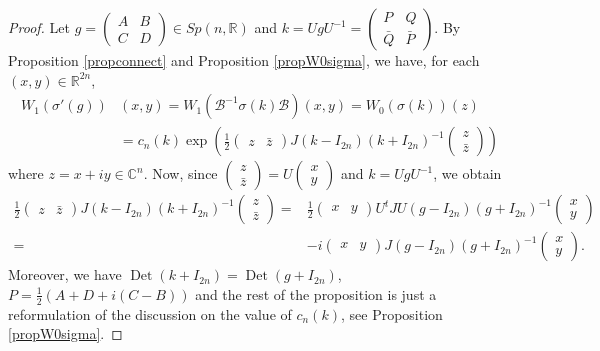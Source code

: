 \documentclass[12pt]{amsart}
\numberwithin{equation}{section}
\DeclareMathOperator{\Det}{Det} \DeclareMathOperator{\Tr}{Tr}
\begin{document}
\begin{proof} Let $g=\left(\begin{smallmatrix} A&B\\
C&D\end{smallmatrix}\right)\in Sp(n,{\mathbb R})$ and $k=UgU^{-1}=
\left(\begin{smallmatrix} P&Q\\
{\bar Q}&{\bar P}\end{smallmatrix}\right)$. By Proposition \ref{propconnect} and Proposition \ref{propW0sigma}, we have, for each $(x,y)\in {\mathbb R}^{2n}$, 
\begin{align*}W_1(\sigma'(g))&(x,y)=W_1({\mathcal B}^{-1}\sigma(k){\mathcal B})(x,y)=
W_0(\sigma(k))(z)\\
&=
c_n(k) \exp \left( \tfrac{1}{2}\begin{pmatrix}z&
{\bar z}\end{pmatrix}J(k-I_{2n})
(k+I_{2n})^{-1}\begin{pmatrix}z\\{\bar z}\end{pmatrix}\right)
\end{align*} where $z=x+iy\in {\mathbb C}^{n}$.
Now, since $\left(\begin{smallmatrix}z\\{\bar z}\end{smallmatrix}\right)=U
\left(\begin{smallmatrix}x\\y\end{smallmatrix}\right)$ and $k=UgU^{-1}$, we obtain
\begin{align*}
 \tfrac{1}{2}\begin{pmatrix}z&
{\bar z}\end{pmatrix}J(k-I_{2n})
(k+I_{2n})^{-1}\begin{pmatrix}z\\{\bar z}\end{pmatrix}=& \tfrac{1}{2} \begin{pmatrix}x&
y\end{pmatrix}U^tJU
(g-I_{2n})
(g+I_{2n})^{-1}\begin{pmatrix}x\\y\end{pmatrix}\\
=&-i\begin{pmatrix}x&y\end{pmatrix}
J(g-I_{2n})
(g+I_{2n})^{-1}\begin{pmatrix}x\\y\end{pmatrix}.
\end{align*}
Moreover, we have $\Det(k+I_{2n})=\Det(g+I_{2n})$, $P=\tfrac{1}{2}(A+D+i(C-B))$
and the rest of the proposition is just a reformulation of the discussion on the value of $c_n(k)$, see Proposition \ref{propW0sigma}.
\end{proof}
\end{document}
